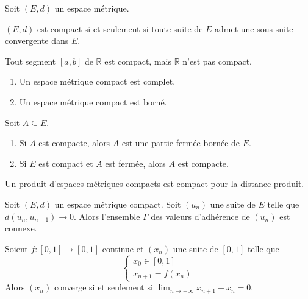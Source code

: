   Soit $(E,d)$ un espace métrique.

  \begin{theorem}
    $(E,d)$ est compact si et seulement si toute suite de $E$ admet une sous-suite convergente dans $E$.
  \end{theorem}

  \begin{example}
    Tout segment $[a,b]$ de $\mathbb{R}$ est compact, mais $\mathbb{R}$ n'est pas compact.
  \end{example}

  \begin{proposition}
    \begin{enumerate}[label={\bfseries(\roman*)}]
      \item Un espace métrique compact est complet.
      \item Un espace métrique compact est borné.
    \end{enumerate}
  \end{proposition}

  \begin{proposition}
    Soit $A \subseteq E$.
    \begin{enumerate}[label={\bfseries(\roman*)}]
      \item Si $A$ est compacte, alors $A$ est une partie fermée bornée de $E$.
      \item Si $E$ est compact et $A$ est fermée, alors $A$ est compacte.
    \end{enumerate}
  \end{proposition}

  \begin{proposition}
    Un produit d'espaces métriques compacts est compact pour la distance produit.
  \end{proposition}


  \begin{application}
    Soit $(E, d)$ un espace métrique compact. Soit $(u_n)$ une suite de $E$ telle que $d(u_n,u_{n-1}) \longrightarrow 0$. Alors l'ensemble $\Gamma$ des valeurs d'adhérence de $(u_n)$ est connexe.
  \end{application}

  \begin{corollary}
    Soient $f : [0, 1] \rightarrow [0, 1]$ continue et $(x_n)$ une suite de $[0, 1]$ telle que
    \[ \begin{cases} x_0 \in [0, 1] \\ x_{n+1} = f(x_n) \end{cases} \]
    Alors $(x_n)$ converge si et seulement si $\lim_{n \rightarrow +\infty } x_{n+1} - x_n = 0$.
  \end{corollary}

